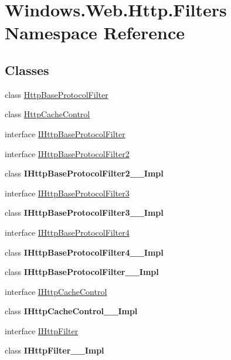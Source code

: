 \hypertarget{namespace_windows_1_1_web_1_1_http_1_1_filters}{}\section{Windows.\+Web.\+Http.\+Filters Namespace Reference}
\label{namespace_windows_1_1_web_1_1_http_1_1_filters}
\subsection*{Classes}
\begin{DoxyCompactItemize}
\item 
class \hyperlink{class_windows_1_1_web_1_1_http_1_1_filters_1_1_http_base_protocol_filter}{Http\+Base\+Protocol\+Filter}
\item 
class \hyperlink{class_windows_1_1_web_1_1_http_1_1_filters_1_1_http_cache_control}{Http\+Cache\+Control}
\item 
interface \hyperlink{interface_windows_1_1_web_1_1_http_1_1_filters_1_1_i_http_base_protocol_filter}{I\+Http\+Base\+Protocol\+Filter}
\item 
interface \hyperlink{interface_windows_1_1_web_1_1_http_1_1_filters_1_1_i_http_base_protocol_filter2}{I\+Http\+Base\+Protocol\+Filter2}
\item 
class {\bfseries I\+Http\+Base\+Protocol\+Filter2\+\_\+\+\_\+\+Impl}
\item 
interface \hyperlink{interface_windows_1_1_web_1_1_http_1_1_filters_1_1_i_http_base_protocol_filter3}{I\+Http\+Base\+Protocol\+Filter3}
\item 
class {\bfseries I\+Http\+Base\+Protocol\+Filter3\+\_\+\+\_\+\+Impl}
\item 
interface \hyperlink{interface_windows_1_1_web_1_1_http_1_1_filters_1_1_i_http_base_protocol_filter4}{I\+Http\+Base\+Protocol\+Filter4}
\item 
class {\bfseries I\+Http\+Base\+Protocol\+Filter4\+\_\+\+\_\+\+Impl}
\item 
class {\bfseries I\+Http\+Base\+Protocol\+Filter\+\_\+\+\_\+\+Impl}
\item 
interface \hyperlink{interface_windows_1_1_web_1_1_http_1_1_filters_1_1_i_http_cache_control}{I\+Http\+Cache\+Control}
\item 
class {\bfseries I\+Http\+Cache\+Control\+\_\+\+\_\+\+Impl}
\item 
interface \hyperlink{interface_windows_1_1_web_1_1_http_1_1_filters_1_1_i_http_filter}{I\+Http\+Filter}
\item 
class {\bfseries I\+Http\+Filter\+\_\+\+\_\+\+Impl}
\end{DoxyCompactItemize}
